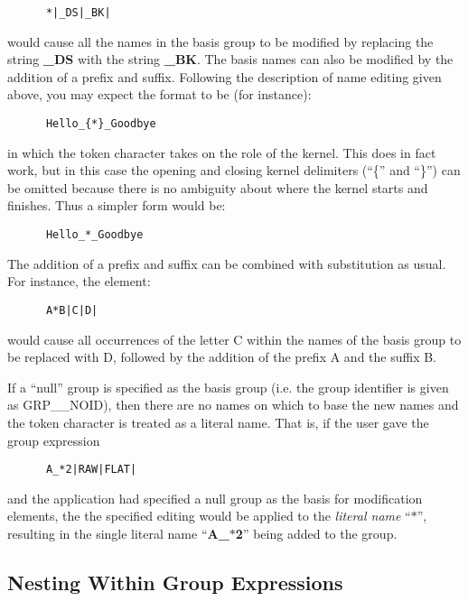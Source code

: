 \small
\begin{verbatim}
      *|_DS|_BK|
\end{verbatim}
\normalsize

would cause all the names in the basis group to be modified by replacing the
string {\bf \_DS} with the string {\bf \_BK}. The basis names can also be
modified by the addition of a prefix and suffix. Following the description of
name editing given above, you may expect the format to be (for instance):

\small
\begin{verbatim}
      Hello_{*}_Goodbye
\end{verbatim}
\normalsize

in which the token character takes on the role of the kernel. This does in fact
work, but in this case the opening and closing kernel delimiters (``\{'' and
``\}'') can be omitted because there is no ambiguity about where the kernel
starts and finishes. Thus a simpler form would be:

\small
\begin{verbatim}
      Hello_*_Goodbye
\end{verbatim}
\normalsize

The addition of a prefix and suffix can be combined with substitution as
usual. For instance, the element:

\small
\begin{verbatim}
      A*B|C|D|
\end{verbatim}
\normalsize

would cause all occurrences of the letter C within the names of the basis group
to be replaced with D, followed by the addition of the prefix A and the suffix
B.

If a ``null'' group is specified as the basis group (i.e. the group identifier
is given as GRP\_\_NOID), then there are no
names on which to base the new names and the token character is treated as a
literal name. That is, if the user gave the group expression

\small
\begin{verbatim}
      A_*2|RAW|FLAT|
\end{verbatim}
\normalsize

and the application had specified a null group as the basis for modification
elements, the the specified editing would be applied to the {\em literal name}
``$*$'', resulting in the single literal name ``{\bf A\_$*$2}'' being added to the
group.

\subsection{\label{SEC:NEST}Nesting Within Group Expressions}

